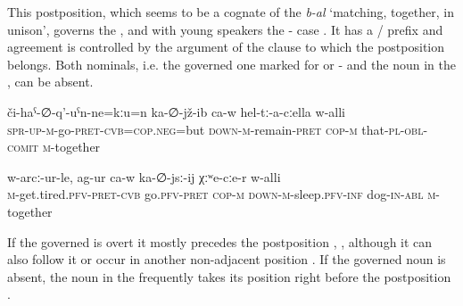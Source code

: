 This postposition, which seems to be a cognate of the  \textit{b-al} `matching, together, in unison', governs the  , and with young speakers the - case . It has a / prefix and agreement is controlled by the  argument of the clause to which the postposition belongs. Both nominals, i.e. the governed one marked for  or - and the noun in the , can be absent.

\begin{exe}
	\ex
	\begin{xlist}
		\ex	\label{He is sitting together with them}
		\gll	či-haˁ-∅-q'-uˁn-ne=kːu=n	ka-∅-jž-ib	ca-w	hel-tː-a-cːella	w-alli  \\
			\textsc{spr-up}-\textsc{m}-go-\textsc{pret}-\textsc{cvb}=\textsc{cop.neg}=but	\textsc{down-m}-remain-\textsc{pret}	\textsc{cop-m}	that-\textsc{pl}-\textsc{obl}-\textsc{comit}	\textsc{m}-together\\
		\glt	{}

		\ex	\label{He went to sleep together with the dog}
		\gll	w-arcː-ur-le,	ag-ur	ca-w	ka-∅-jsː-ij	χːʷe-cːe-r	w-alli  \\
			\textsc{m}-get.tired.\textsc{pfv}-\textsc{pret}-\textsc{cvb}	go.\textsc{pfv}-\textsc{pret}	\textsc{cop}-\textsc{m} \textsc{down-m}-sleep.\textsc{pfv}-\textsc{inf}	dog-\textsc{in}-\textsc{abl}	\textsc{m}-together\\
		\glt	{}
	\end{xlist}
\end{exe}

If the governed  is overt it mostly precedes the postposition , , although it can also follow it  or occur in another non-adjacent position . If the governed noun is absent, the noun in the  frequently takes its position right before the postposition .

